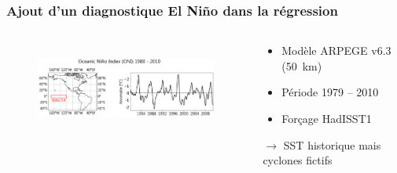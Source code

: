\documentclass[aspectratio=169, usepdftitle=false, xcolor={dvipsnames}, 9pt,table]{beamer}
\begin{document}
\begin{frame}[t]
    \frametitle{Ajout d'un diagnostique El Niño dans la régression}
    \scriptsize
    \begin{columns}
        \begin{column}{0.62\textwidth}
            \vspace{-3em} 
            \begin{figure}[htpb]
                \centering
                \includegraphics[height=3cm]{Figures/ONI.png}
            \end{figure} 
        \end{column}
        \begin{column}{0.38\textwidth}
            \begin{definition}
                \setlength{\leftmargini}{2.5ex}
                \begin{itemize}
                    \item Modèle ARPEGE v6.3 (50~km) \parencite{voldoire_evaluation_2019}
                    \item Période 1979 -- 2010
                    \item Forçage HadISST1
                \end{itemize}
                $\longrightarrow$ SST \alert{historique} mais cyclones \alert{fictifs}
            \end{definition}
        \end{column}
    \end{columns}
    \vspace{2em}
\end{frame}
\end{document}
